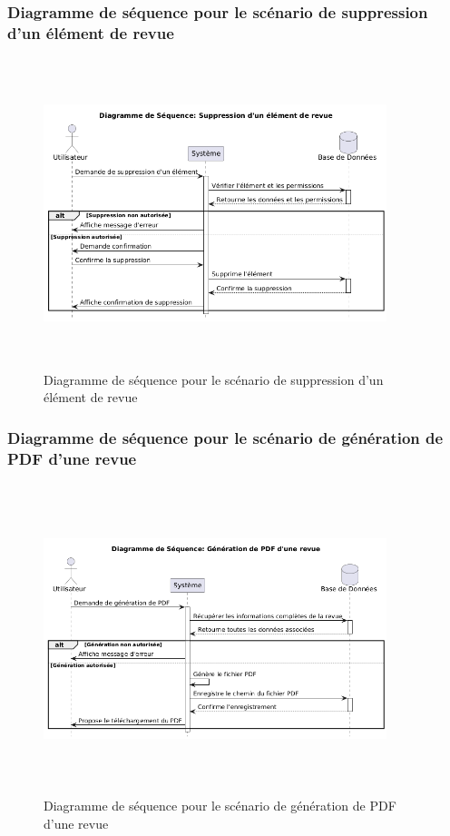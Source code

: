 \subsubsection{Diagramme de séquence pour le scénario de suppression d'un élément de revue}
\begin{figure}[H]
    \centering
    \includegraphics[width=10cm,height=9cm]{images/deleteelementrevueseq.png}
    \caption{Diagramme de séquence pour le scénario de suppression d'un élément de revue}
\end{figure}

\subsubsection{Diagramme de séquence pour le scénario de génération de PDF d'une revue}
\begin{figure}[H]
    \centering
    \includegraphics[width=10cm,height=9cm]{images/generatepdfrevueseq.png}
    \caption{Diagramme de séquence pour le scénario de génération de PDF d'une revue}
\end{figure}


